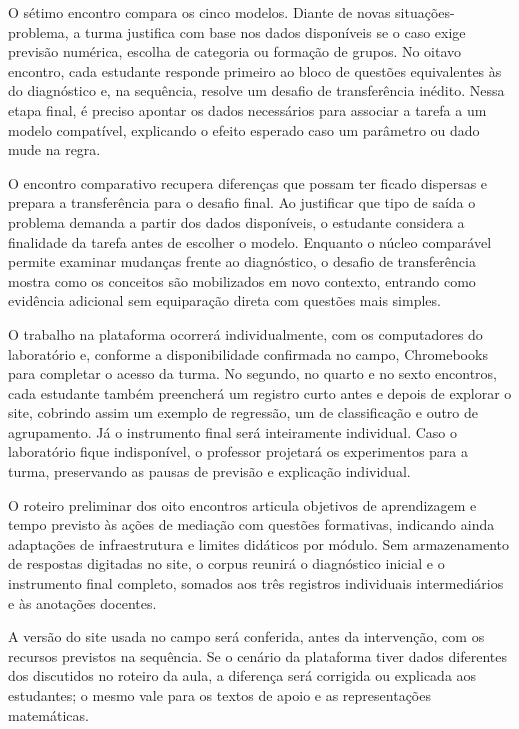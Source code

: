 O sétimo encontro compara os cinco modelos. Diante de novas situações-problema, a turma justifica com base nos dados disponíveis se o caso exige previsão numérica, escolha de categoria ou formação de grupos. No oitavo encontro, cada estudante responde primeiro ao bloco de questões equivalentes às do diagnóstico e, na sequência, resolve um desafio de transferência inédito. Nessa etapa final, é preciso apontar os dados necessários para associar a tarefa a um modelo compatível, explicando o efeito esperado caso um parâmetro ou dado mude na regra.

O encontro comparativo recupera diferenças que possam ter ficado dispersas e prepara a transferência para o desafio final. Ao justificar que tipo de saída o problema demanda a partir dos dados disponíveis, o estudante considera a finalidade da tarefa antes de escolher o modelo. Enquanto o núcleo comparável permite examinar mudanças frente ao diagnóstico, o desafio de transferência mostra como os conceitos são mobilizados em novo contexto, entrando como evidência adicional sem equiparação direta com questões mais simples.

O trabalho na plataforma ocorrerá individualmente, com os computadores do laboratório e, conforme a disponibilidade confirmada no campo, Chromebooks para completar o acesso da turma. No segundo, no quarto e no sexto encontros, cada estudante também preencherá um registro curto antes e depois de explorar o site, cobrindo assim um exemplo de regressão, um de classificação e outro de agrupamento. Já o instrumento final será inteiramente individual. Caso o laboratório fique indisponível, o professor projetará os experimentos para a turma, preservando as pausas de previsão e explicação individual.

O roteiro preliminar dos oito encontros articula objetivos de aprendizagem e tempo previsto às ações de mediação com questões formativas, indicando ainda adaptações de infraestrutura e limites didáticos por módulo. Sem armazenamento de respostas digitadas no site, o corpus reunirá o diagnóstico inicial e o instrumento final completo, somados aos três registros individuais intermediários e às anotações docentes.

A versão do site usada no campo será conferida, antes da intervenção, com os recursos previstos na sequência. Se o cenário da plataforma tiver dados diferentes dos discutidos no roteiro da aula, a diferença será corrigida ou explicada aos estudantes; o mesmo vale para os textos de apoio e as representações matemáticas.

